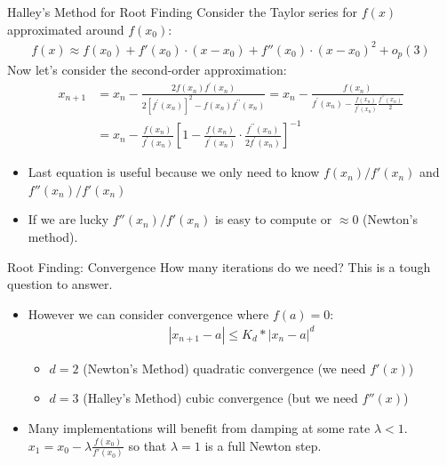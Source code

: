 \documentclass[xcolor=pdftex,dvipsnames,table,mathserif,aspectratio=169]{beamer}
\begin{document}
\begin{frame}{Halley's Method for Root Finding}
Consider the Taylor series for $f(x)$ approximated around $f(x_0)$:
\begin{align*}
f(x) \approx f(x_0) + f'(x_0) \cdot (x-x_0) + f''(x_0) \cdot (x-x_0)^2 + o_p(3)
\end{align*}
Now let's consider the second-order approximation:
\begin{align*}
x_{n+1}
&=x_{n}-\frac{2 f\left(x_{n}\right) f^{\prime}\left(x_{n}\right)}{2\left[f^{\prime}\left(x_{n}\right)\right]^{2}-f\left(x_{n}\right) f^{\prime \prime}\left(x_{n}\right)}
=x_{n}-\frac{f\left(x_{n}\right)}{f^{\prime}\left(x_{n}\right)-\frac{f\left(x_{n}\right)}{f^{\prime}\left(x_{n}\right)} \frac{f^{\prime \prime}\left(x_{n}\right)}{2}}\\
&=x_{n}-\frac{f\left(x_{n}\right)}{f^{\prime}\left(x_{n}\right)}\left[1-\frac{f\left(x_{n}\right)}{f^{\prime}\left(x_{n}\right)} \cdot \frac{f^{\prime \prime}\left(x_{n}\right)}{2 f^{\prime}\left(x_{n}\right)}\right]^{-1}
\end{align*}
\vspace{-.4cm}
\begin{itemize}
\item Last equation is useful because we only need to know $f(x_n)/f'(x_n)$ and $f''(x_n)/f'(x_n)$
\item If we are lucky $f''(x_n)/f'(x_n)$ is easy to compute or $\approx 0$ (Newton's method).
\end{itemize}
\end{frame}

\begin{frame}{Root Finding: Convergence}
How many iterations do we need? This is a tough question to answer.
\begin{itemize}
\item However we can consider convergence where $f(a) =0$:
\begin{align*}
\left|x_{n+1}-a\right| \leq K_d *\left|x_{n}-a\right|^{d}
\end{align*}
\begin{itemize}
\item $d=2$ (Newton's Method) \alert{quadratic convergence}  (we need $f'(x)$)
\item $d=3$ (Halley's Method) \alert{cubic convergence} (but we need $f''(x)$)
\end{itemize}
\item Many implementations will benefit from damping at some rate $\lambda <1$. $x_1 = x_0-\lambda \frac{f(x_0)}{f'(x_0)} $ so that $\lambda=1$ is a \alert{full Newton step}.
\end{itemize}
\end{frame}
\end{document}
